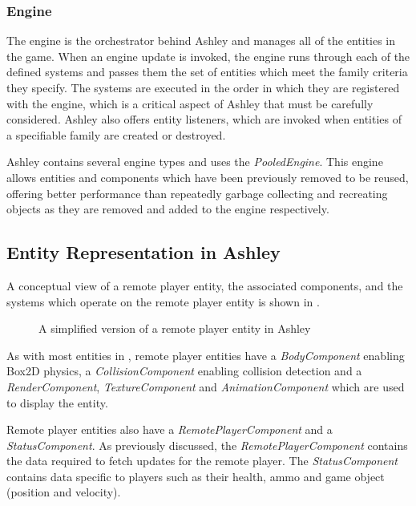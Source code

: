 \subsubsection{Engine}
The engine is the orchestrator behind Ashley and manages all of the entities in the game. When an engine update is invoked, the engine runs through each of the defined systems and passes them the set of entities which meet the family criteria they specify. The systems are executed in the order in which they are registered with the engine, which is a critical aspect of Ashley that must be carefully considered. Ashley also offers entity listeners, which are invoked when entities of a specifiable family are created or destroyed.

Ashley contains several engine types and \game{} uses the \textit{PooledEngine}. This engine allows entities and components  which have been previously removed to be reused, offering better performance than repeatedly garbage collecting and recreating objects as they are removed and added to the engine respectively. 
 
\subsection{Entity Representation in Ashley}
A conceptual view of a remote player entity, the associated components, and the systems which operate on the remote player entity is shown in . 

\begin{figure}[H]
    \centering
    \caption{A simplified version of a remote player entity in Ashley}
    \label{fig:impl:ashley}
\end{figure}

As with most entities in \game{}, remote player entities have a \textit{BodyComponent} enabling Box2D physics, a \textit{CollisionComponent} enabling collision detection and a \textit{RenderComponent}, \textit{TextureComponent} and \textit{AnimationComponent} which are used to display the entity. 

Remote player entities also have a \textit{RemotePlayerComponent} and a \textit{StatusComponent}. As previously discussed, the \textit{RemotePlayerComponent} contains the data required to fetch updates for the remote player. The \textit{StatusComponent} contains data specific to players such as their health, ammo and game object (position and velocity). 

